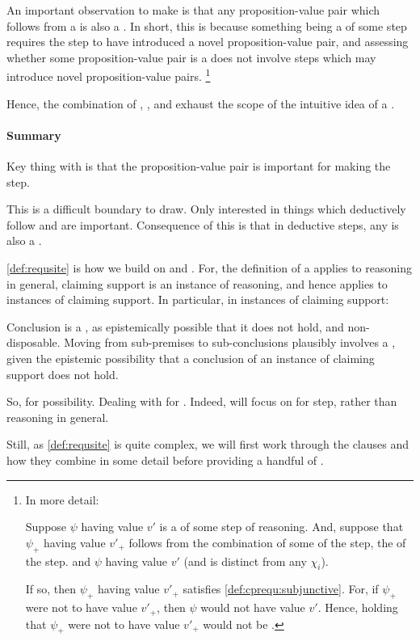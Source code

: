 \begin{note}
  An important observation to make is that any proposition-value pair which follows from a \cprequ{} is also a \cprequ{}.
  In short, this is because something being a \cprequ{} of some step requires the step to have introduced a novel proposition-value pair, and assessing whether some proposition-value pair is a \cprequ{} does not involve steps which may introduce novel proposition-value pairs.\nolinebreak
  \footnote{
    In more detail:

    Suppose \(\psi\) having value \(v'\) is a \cprequ{} of some step of reasoning.
    And, suppose that \(\psi_{+}\) having value \(v'_{+}\) follows from the combination of some  of the step, the  of the step. and \(\psi\) having value \(v'\) (and is distinct from any \(\chi_{i}\)).

    If so, then \(\psi_{+}\) having value \(v'_{+}\) satisfies \ref{def:cprequ:subjunctive}.
    For, if \(\psi_{+}\) were not to have value \(v'_{+}\), then \(\psi\) would not have value \(v'\).
    Hence, holding that \(\psi_{+}\) were not to have value \(v'_{+}\) would not be \epVAd{}.
  }

  Hence, the combination of , , and  exhaust the scope of the intuitive idea of a \requ{}.
\end{note}

\paragraph{Summary}

\begin{note}
  Key thing with  is that the proposition-value pair is important for making the step.

  This is a difficult boundary to draw.
  Only interested in things which deductively follow and are important.
  Consequence of this is that in deductive steps, any \crequ{} is also a \prequ{}.
\end{note}


\begin{note}
  \autoref{def:requsite} is how we build on \ideaCSA{} and \ideaCSB{}.
  For, the definition of a \requ{} applies to reasoning in general, claiming support is an instance of reasoning, and hence applies to instances of claiming support.
  In particular, in instances of claiming support:
  {
    \color{reword}
    Conclusion is a \requ{}, as epistemically possible that it does not hold, and non-disposable.
    Moving from sub-premises to sub-conclusions plausibly involves a \requ{}, given the epistemic possibility that a conclusion of an instance of claiming support does not hold.

    So, \ideaCSA{} for possibility.
    Dealing with  for \ideaCSB{}.
    Indeed, \ideaCSB{} will focus on \requ{} for step, rather than reasoning in general.
  }

  Still, as \autoref{def:requsite} is quite complex, we will first work through the clauses and how they combine in some detail before providing a handful of .
\end{note}


